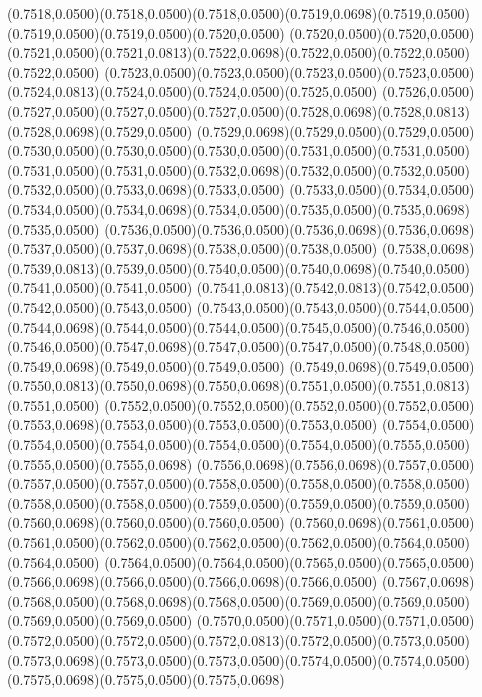 (0.7518,0.0500)(0.7518,0.0500)(0.7518,0.0500)(0.7519,0.0698)(0.7519,0.0500)(0.7519,0.0500)(0.7519,0.0500)(0.7520,0.0500)
(0.7520,0.0500)(0.7520,0.0500)(0.7521,0.0500)(0.7521,0.0813)(0.7522,0.0698)(0.7522,0.0500)(0.7522,0.0500)(0.7522,0.0500)
(0.7523,0.0500)(0.7523,0.0500)(0.7523,0.0500)(0.7523,0.0500)(0.7524,0.0813)(0.7524,0.0500)(0.7524,0.0500)(0.7525,0.0500)
(0.7526,0.0500)(0.7527,0.0500)(0.7527,0.0500)(0.7527,0.0500)(0.7528,0.0698)(0.7528,0.0813)(0.7528,0.0698)(0.7529,0.0500)
(0.7529,0.0698)(0.7529,0.0500)(0.7529,0.0500)(0.7530,0.0500)(0.7530,0.0500)(0.7530,0.0500)(0.7531,0.0500)(0.7531,0.0500)
(0.7531,0.0500)(0.7531,0.0500)(0.7532,0.0698)(0.7532,0.0500)(0.7532,0.0500)(0.7532,0.0500)(0.7533,0.0698)(0.7533,0.0500)
(0.7533,0.0500)(0.7534,0.0500)(0.7534,0.0500)(0.7534,0.0698)(0.7534,0.0500)(0.7535,0.0500)(0.7535,0.0698)(0.7535,0.0500)
(0.7536,0.0500)(0.7536,0.0500)(0.7536,0.0698)(0.7536,0.0698)(0.7537,0.0500)(0.7537,0.0698)(0.7538,0.0500)(0.7538,0.0500)
(0.7538,0.0698)(0.7539,0.0813)(0.7539,0.0500)(0.7540,0.0500)(0.7540,0.0698)(0.7540,0.0500)(0.7541,0.0500)(0.7541,0.0500)
(0.7541,0.0813)(0.7542,0.0813)(0.7542,0.0500)(0.7542,0.0500)(0.7543,0.0500)
\PST@Solid(0.7543,0.0500)(0.7543,0.0500)(0.7544,0.0500)(0.7544,0.0698)(0.7544,0.0500)(0.7544,0.0500)(0.7545,0.0500)(0.7546,0.0500)
(0.7546,0.0500)(0.7547,0.0698)(0.7547,0.0500)(0.7547,0.0500)(0.7548,0.0500)(0.7549,0.0698)(0.7549,0.0500)(0.7549,0.0500)
(0.7549,0.0698)(0.7549,0.0500)(0.7550,0.0813)(0.7550,0.0698)(0.7550,0.0698)(0.7551,0.0500)(0.7551,0.0813)(0.7551,0.0500)
(0.7552,0.0500)(0.7552,0.0500)(0.7552,0.0500)(0.7552,0.0500)(0.7553,0.0698)(0.7553,0.0500)(0.7553,0.0500)(0.7553,0.0500)
(0.7554,0.0500)(0.7554,0.0500)(0.7554,0.0500)(0.7554,0.0500)(0.7554,0.0500)(0.7555,0.0500)(0.7555,0.0500)(0.7555,0.0698)
(0.7556,0.0698)(0.7556,0.0698)(0.7557,0.0500)(0.7557,0.0500)(0.7557,0.0500)(0.7558,0.0500)(0.7558,0.0500)(0.7558,0.0500)
(0.7558,0.0500)(0.7558,0.0500)(0.7559,0.0500)(0.7559,0.0500)(0.7559,0.0500)(0.7560,0.0698)(0.7560,0.0500)(0.7560,0.0500)
(0.7560,0.0698)(0.7561,0.0500)(0.7561,0.0500)(0.7562,0.0500)(0.7562,0.0500)(0.7562,0.0500)(0.7564,0.0500)(0.7564,0.0500)
(0.7564,0.0500)(0.7564,0.0500)(0.7565,0.0500)(0.7565,0.0500)(0.7566,0.0698)(0.7566,0.0500)(0.7566,0.0698)(0.7566,0.0500)
(0.7567,0.0698)(0.7568,0.0500)(0.7568,0.0698)(0.7568,0.0500)(0.7569,0.0500)(0.7569,0.0500)(0.7569,0.0500)(0.7569,0.0500)
(0.7570,0.0500)(0.7571,0.0500)(0.7571,0.0500)(0.7572,0.0500)(0.7572,0.0500)(0.7572,0.0813)(0.7572,0.0500)(0.7573,0.0500)
(0.7573,0.0698)(0.7573,0.0500)(0.7573,0.0500)(0.7574,0.0500)(0.7574,0.0500)(0.7575,0.0698)(0.7575,0.0500)(0.7575,0.0698)

